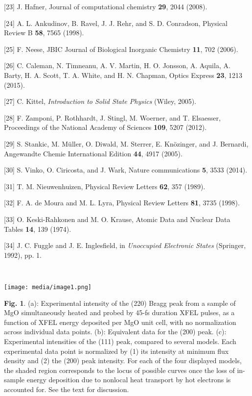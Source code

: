 {[}23{]} J. Hafner, Journal of computational chemistry \textbf{29}, 2044
(2008).

{[}24{]} A. L. Ankudinov, B. Ravel, J. J. Rehr, and S. D. Conradson,
Physical Review B \textbf{58}, 7565 (1998).

{[}25{]} F. Neese, JBIC Journal of Biological Inorganic Chemistry
\textbf{11}, 702 (2006).

{[}26{]} C. Caleman, N. Timneanu, A. V. Martin, H. O. Jonsson, A.
Aquila, A. Barty, H. A. Scott, T. A. White, and H. N. Chapman, Optics
Express \textbf{23}, 1213 (2015).

{[}27{]} C. Kittel, \emph{Introduction to Solid State Physics} (Wiley,
2005).

{[}28{]} F. Zamponi, P. Rothhardt, J. Stingl, M. Woerner, and T.
Elsaesser, Proceedings of the National Academy of Sciences \textbf{109},
5207 (2012).

{[}29{]} S. Stankic, M. Müller, O. Diwald, M. Sterrer, E. Knözinger, and
J. Bernardi, Angewandte Chemie International Edition \textbf{44}, 4917
(2005).

{[}30{]} S. Vinko, O. Ciricosta, and J. Wark, Nature communications
\textbf{5}, 3533 (2014).

{[}31{]} T. M. Nieuwenhuizen, Physical Review Letters \textbf{62}, 357
(1989).

{[}32{]} F. A. de Moura and M. L. Lyra, Physical Review Letters
\textbf{81}, 3735 (1998).

{[}33{]} O. Keski-Rahkonen and M. O. Krause, Atomic Data and Nuclear
Data Tables \textbf{14}, 139 (1974).

{[}34{]} J. C. Fuggle and J. E. Inglesfield, in \emph{Unoccupied
Electronic States} (Springer, 1992), pp. 1.

\textbf{\\}

\texttt{[image: media/image1.png]}

\textbf{Fig. 1}. (a): Experimental intensity of the (220) Bragg peak
from a sample of MgO simultaneously heated and probed by 45-fs duration
XFEL pulses, as a function of XFEL energy deposited per MgO unit cell,
with no normalization across individual data points. (b): Equivalent
data for the (200) peak. (c): Experimental intensities of the (111)
peak, compared to several models. Each experimental data point is
normalized by (1) its intensity at minimum flux density and (2) the
(200) peak intensity. For each of the four displayed models, the shaded
region corresponds to the locus of possible curves once the loss of
in-sample energy deposition due to nonlocal heat transport by hot
electrons is accounted for. See the text for discussion.

